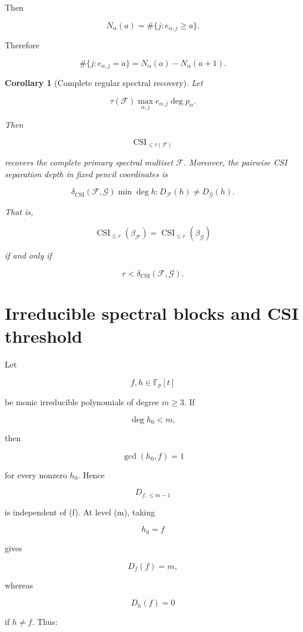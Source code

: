 \documentclass[11pt]{article}
\newtheorem{corollary}[theorem]{Corollary}
\begin{document}
Then

\[
N_\alpha(a)
=\#\{j:e_{\alpha,j}\ge a\}.
\]

Therefore

\[
\#\{j:e_{\alpha,j}=a\}
=N_\alpha(a)-N_\alpha(a+1).
\tag{7.2}
\]

\begin{corollary}[Complete regular spectral recovery]
Let

\[
\tau(\mathcal F)
\max_{\alpha,j} e_{\alpha,j}\deg p_\alpha.
\]

Then

\[
\operatorname{CSI}_{\le \tau(\mathcal F)}
\]

recovers the complete primary spectral multiset $\mathcal F$. Moreover, the pairwise CSI separation depth in fixed pencil coordinates is

\[
\boxed{
\delta_{\mathrm{CSI}}(\mathcal F,\mathcal G)
\min{\deg h:D_{\mathcal F}(h)\ne D_{\mathcal G}(h)}.
}
\tag{7.3}
\]

That is,

\[
\operatorname{CSI}_{\le r}(\beta_{\mathcal F})
=
\operatorname{CSI}_{\le r}(\beta_{\mathcal G})
\]

if and only if

\[
r<\delta_{\mathrm{CSI}}(\mathcal F,\mathcal G).
\]

\end{corollary}

\section{Irreducible spectral blocks and CSI threshold}

Let

\[
f,h\in\mathbb F_p[t]
\]

be monic irreducible polynomials of degree $m\ge3$. If

\[
\deg h_0<m,
\]

then

\[
\gcd(h_0,f)=1
\]

for every nonzero $h_0$. Hence

\[
D_{{f},\le m-1}
\]

is independent of (f). At level (m), taking

\[
h_0=f
\]

gives

\[
D_{{f}}(f)=m,
\]

whereas

\[
D_{{h}}(f)=0
\]

if $h\ne f$. Thus:
\end{document}
